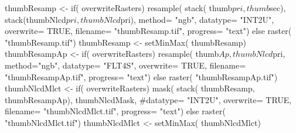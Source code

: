 
\begin{Schunk}
\begin{Sinput}
 thumbResamp <-
   if( overwriteRasters) {
     resample( stack( thumb$pri, thumb$sec),
              stack(thumbNlcd$pri, thumbNlcd$pri),
              method= "ngb",
              datatype= "INT2U",
              overwrite= TRUE,
              filename= "thumbResamp.tif",
              progress= "text")
   } else raster( "thumbResamp.tif")
 thumbResamp <- setMinMax( thumbResamp)
 thumbResampAp <-
   if( overwriteRasters) {
     resample( thumb$Ap, thumbNlcd$pri,
              method="ngb",
              datatype= "FLT4S",
              overwrite= TRUE,
              filename= "thumbResampAp.tif",
              progress= "text")
   } else raster( "thumbResampAp.tif")
 thumbNlcdMlct <-
   if( overwriteRasters) {
     mask( stack( thumbResamp, thumbResampAp),
          thumbNlcdMask,
          #datatype= "INT2U",
          overwrite= TRUE,
          filename= "thumbNlcdMlct.tif",
          progress= "text")
   } else raster( "thumbNlcdMlct.tif")
 thumbNlcdMlct <- setMinMax( thumbNlcdMlct)
\end{Sinput}
\end{Schunk}



